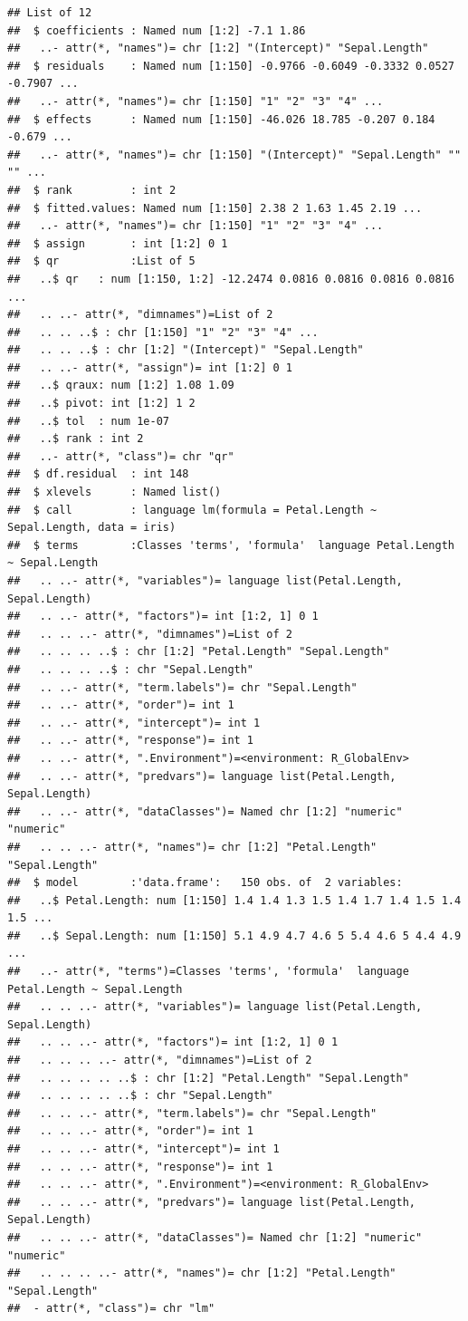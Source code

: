 \documentclass[
]{book}
\begin{document}
\begin{verbatim}
## List of 12
##  $ coefficients : Named num [1:2] -7.1 1.86
##   ..- attr(*, "names")= chr [1:2] "(Intercept)" "Sepal.Length"
##  $ residuals    : Named num [1:150] -0.9766 -0.6049 -0.3332 0.0527 -0.7907 ...
##   ..- attr(*, "names")= chr [1:150] "1" "2" "3" "4" ...
##  $ effects      : Named num [1:150] -46.026 18.785 -0.207 0.184 -0.679 ...
##   ..- attr(*, "names")= chr [1:150] "(Intercept)" "Sepal.Length" "" "" ...
##  $ rank         : int 2
##  $ fitted.values: Named num [1:150] 2.38 2 1.63 1.45 2.19 ...
##   ..- attr(*, "names")= chr [1:150] "1" "2" "3" "4" ...
##  $ assign       : int [1:2] 0 1
##  $ qr           :List of 5
##   ..$ qr   : num [1:150, 1:2] -12.2474 0.0816 0.0816 0.0816 0.0816 ...
##   .. ..- attr(*, "dimnames")=List of 2
##   .. .. ..$ : chr [1:150] "1" "2" "3" "4" ...
##   .. .. ..$ : chr [1:2] "(Intercept)" "Sepal.Length"
##   .. ..- attr(*, "assign")= int [1:2] 0 1
##   ..$ qraux: num [1:2] 1.08 1.09
##   ..$ pivot: int [1:2] 1 2
##   ..$ tol  : num 1e-07
##   ..$ rank : int 2
##   ..- attr(*, "class")= chr "qr"
##  $ df.residual  : int 148
##  $ xlevels      : Named list()
##  $ call         : language lm(formula = Petal.Length ~ Sepal.Length, data = iris)
##  $ terms        :Classes 'terms', 'formula'  language Petal.Length ~ Sepal.Length
##   .. ..- attr(*, "variables")= language list(Petal.Length, Sepal.Length)
##   .. ..- attr(*, "factors")= int [1:2, 1] 0 1
##   .. .. ..- attr(*, "dimnames")=List of 2
##   .. .. .. ..$ : chr [1:2] "Petal.Length" "Sepal.Length"
##   .. .. .. ..$ : chr "Sepal.Length"
##   .. ..- attr(*, "term.labels")= chr "Sepal.Length"
##   .. ..- attr(*, "order")= int 1
##   .. ..- attr(*, "intercept")= int 1
##   .. ..- attr(*, "response")= int 1
##   .. ..- attr(*, ".Environment")=<environment: R_GlobalEnv> 
##   .. ..- attr(*, "predvars")= language list(Petal.Length, Sepal.Length)
##   .. ..- attr(*, "dataClasses")= Named chr [1:2] "numeric" "numeric"
##   .. .. ..- attr(*, "names")= chr [1:2] "Petal.Length" "Sepal.Length"
##  $ model        :'data.frame':	150 obs. of  2 variables:
##   ..$ Petal.Length: num [1:150] 1.4 1.4 1.3 1.5 1.4 1.7 1.4 1.5 1.4 1.5 ...
##   ..$ Sepal.Length: num [1:150] 5.1 4.9 4.7 4.6 5 5.4 4.6 5 4.4 4.9 ...
##   ..- attr(*, "terms")=Classes 'terms', 'formula'  language Petal.Length ~ Sepal.Length
##   .. .. ..- attr(*, "variables")= language list(Petal.Length, Sepal.Length)
##   .. .. ..- attr(*, "factors")= int [1:2, 1] 0 1
##   .. .. .. ..- attr(*, "dimnames")=List of 2
##   .. .. .. .. ..$ : chr [1:2] "Petal.Length" "Sepal.Length"
##   .. .. .. .. ..$ : chr "Sepal.Length"
##   .. .. ..- attr(*, "term.labels")= chr "Sepal.Length"
##   .. .. ..- attr(*, "order")= int 1
##   .. .. ..- attr(*, "intercept")= int 1
##   .. .. ..- attr(*, "response")= int 1
##   .. .. ..- attr(*, ".Environment")=<environment: R_GlobalEnv> 
##   .. .. ..- attr(*, "predvars")= language list(Petal.Length, Sepal.Length)
##   .. .. ..- attr(*, "dataClasses")= Named chr [1:2] "numeric" "numeric"
##   .. .. .. ..- attr(*, "names")= chr [1:2] "Petal.Length" "Sepal.Length"
##  - attr(*, "class")= chr "lm"
\end{verbatim}
\end{document}
